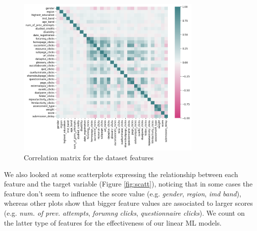 \documentclass{article}
\begin{document}
\begin{figure}
\centering
\includegraphics[width=0.8\textwidth]{correlationmatrix.png}
\caption{\label{fig:corrmatr}Correlation matrix for the dataset features}
\end{figure}

We also looked at some scatterplots expressing the relationship between each feature and the target variable (Figure \ref{fig:scatt}), noticing that in some cases the feature don't seem to influence the score value (e.g. \textit{gender}, \textit{region}, \textit{imd band}), whereas other plots show that bigger feature values are associated to larger scores (e.g. \textit{num. of prev. attempts}, \textit{forumng clicks}, \textit{questionnaire clicks}). We count on the latter type of features for the effectiveness of our linear ML models.\\
\end{document}
